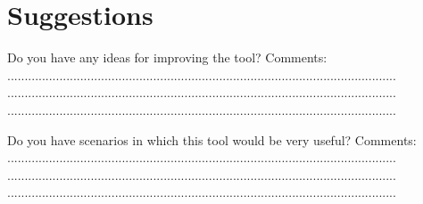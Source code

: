 \documentclass[a4paper]{exam}
\begin{document}
\section{Suggestions}


  Do you have any ideas for improving the tool?\newline
Comments: \newline
................................................................................................................ \newline
................................................................................................................ \newline
................................................................................................................ \newline

Do you have scenarios in which this tool would be very useful? \newline
Comments: \newline
................................................................................................................ \newline
................................................................................................................ \newline
................................................................................................................ \newline 
\end{document}
